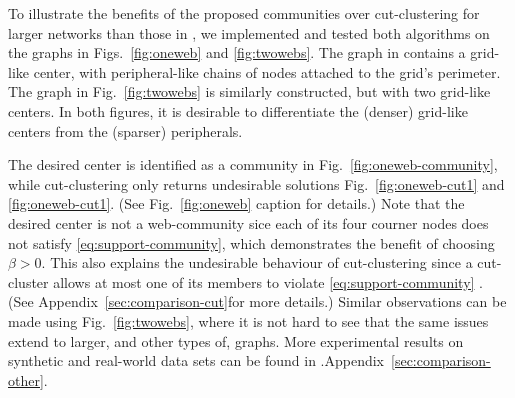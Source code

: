 

To illustrate the benefits of the proposed communities over cut-clustering for larger networks than
those in , we implemented and tested both algorithms on the graphs in
Figs.~\ref{fig:oneweb} and \ref{fig:twowebs}. The graph in  contains a grid-like center,
with peripheral-like chains of nodes attached to the grid's perimeter.
The graph in Fig.~\ref{fig:twowebs} is similarly constructed, but with two grid-like centers.
In both figures, it is desirable to differentiate the (denser) grid-like centers from the (sparser)
peripherals.

The desired center is identified as a community in Fig.~\ref{fig:oneweb-community}, while
cut-clustering only returns undesirable solutions Fig.~\ref{fig:oneweb-cut1} and
\ref{fig:oneweb-cut1}. (See Fig.~\ref{fig:oneweb} caption for details.) 
Note that the desired center is not a web-community sice each of its four courner nodes does not
satisfy \eqref{eq:support-community}, which demonstrates the benefit of choosing $\beta > 0$.
This also explains the undesirable behaviour of cut-clustering since a cut-cluster allows at most
one of its members to violate \eqref{eq:support-community} \cite[Lemma~3.1]{flake:cut-clustering}.
(See \ifPAGELIMIT\cite[Appendix~A]{long}\else Appendix~\ref{sec:comparison-cut}\fi for more details.) Similar observations can be made using
Fig.~\ref{fig:twowebs}, where it is not hard to see that the same issues extend to larger, and other
types of, graphs.
More experimental results on synthetic and real-world data sets can be found in
\ifPAGELIMIT\cite[Appendix~B]{long}.\else Appendix~\ref{sec:comparison-other}.\fi



